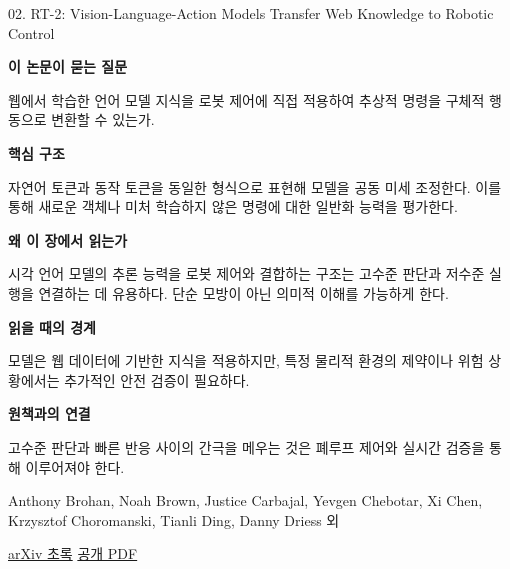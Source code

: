 \documentclass[11pt,openany]{book}
\begin{document}
\begin{termcard}{02. RT-2: Vision-Language-Action Models Transfer Web Knowledge to Robotic Control}

\par

\medskip

{\sffamily\bfseries\color{deepblue} 이 논문이 묻는 질문}\par

웹에서 학습한 언어 모델 지식을 로봇 제어에 직접 적용하여 추상적 명령을 구체적 행동으로 변환할 수 있는가.

\smallskip

{\sffamily\bfseries\color{deepblue} 핵심 구조}\par

자연어 토큰과 동작 토큰을 동일한 형식으로 표현해 모델을 공동 미세 조정한다. 이를 통해 새로운 객체나 미처 학습하지 않은 명령에 대한 일반화 능력을 평가한다.

\smallskip

{\sffamily\bfseries\color{deepblue} 왜 이 장에서 읽는가}\par

시각 언어 모델의 추론 능력을 로봇 제어와 결합하는 구조는 고수준 판단과 저수준 실행을 연결하는 데 유용하다. 단순 모방이 아닌 의미적 이해를 가능하게 한다.

\smallskip

{\sffamily\bfseries\color{coral} 읽을 때의 경계}\par

모델은 웹 데이터에 기반한 지식을 적용하지만, 특정 물리적 환경의 제약이나 위험 상황에서는 추가적인 안전 검증이 필요하다.

\smallskip

{\sffamily\bfseries\color{teal} 원책과의 연결}\par

고수준 판단과 빠른 반응 사이의 간극을 메우는 것은 폐루프 제어와 실시간 검증을 통해 이루어져야 한다.

\medskip

{\footnotesize\color{muted} Anthony Brohan, Noah Brown, Justice Carbajal, Yevgen Chebotar, Xi Chen, Krzysztof Choromanski, Tianli Ding, Danny Driess 외\par

\href{https://arxiv.org/abs/2307.15818}{arXiv 초록} \quad \href{https://arxiv.org/pdf/2307.15818}{공개 PDF}\par}

\end{termcard}
\end{document}
